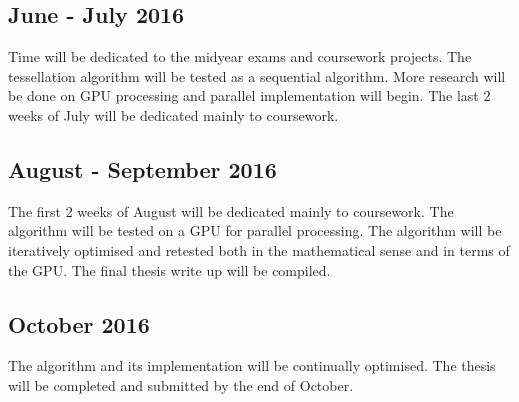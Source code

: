 \subsection{June - July 2016}
Time will be dedicated to the midyear exams and coursework projects. The tessellation algorithm will be tested as a sequential algorithm. More research will be done on GPU processing and parallel implementation will begin. The last 2 weeks of July will be dedicated mainly to coursework.

\subsection{August - September 2016}
The first 2 weeks of August will be dedicated mainly to coursework. The algorithm will be tested on a GPU for parallel processing. The algorithm will be iteratively optimised and retested both in the mathematical sense and in terms of the GPU. The final thesis write up will be compiled.

\subsection{October 2016}
The algorithm and its implementation will be continually optimised. The thesis will be completed and submitted by the end of October.
